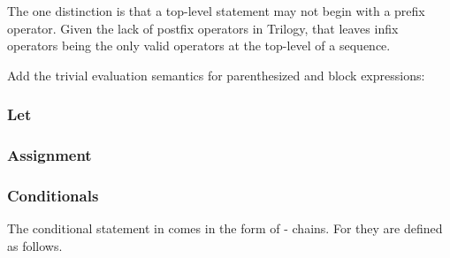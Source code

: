 The one distinction is that a top-level statement may not begin with a
prefix operator. Given the lack of postfix operators in Trilogy, that
leaves infix operators being the only valid operators at the top-level
of a sequence.

Add the trivial evaluation semantics for parenthesized and block
expressions:

\begin{figure}[H]
    \centering
    \parbox[t]{0.35\linewidth}{
        \begin{prooftree}
        \end{prooftree}
    }
    \parbox[t]{0.35\linewidth}{
        \begin{prooftree}
        \end{prooftree}
    }
\end{figure}

\subsubsection{Let}

\subsubsection{Assignment}

\subsubsection{Conditionals}

The conditional statement in \Trilogy{} comes in the form of -
chains. For \Prose{} they are defined as follows.

\begin{bnf*}
     \\
     \\
\end{bnf*}

